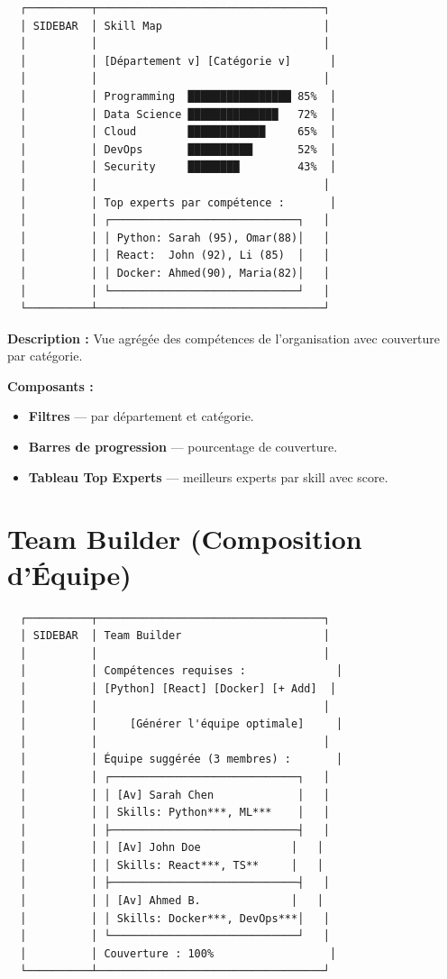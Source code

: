 \documentclass[12pt,a4paper]{article}
\begin{document}
\begin{verbatim}
  ┌──────────┬───────────────────────────────────┐
  │ SIDEBAR  │ Skill Map                         │
  │          │                                   │
  │          │ [Département v] [Catégorie v]      │
  │          │                                   │
  │          │ Programming  ████████████████ 85%  │
  │          │ Data Science ██████████████   72%  │
  │          │ Cloud        ████████████     65%  │
  │          │ DevOps       ██████████       52%  │
  │          │ Security     ████████         43%  │
  │          │                                   │
  │          │ Top experts par compétence :       │
  │          │ ┌─────────────────────────────┐   │
  │          │ │ Python: Sarah (95), Omar(88)│   │
  │          │ │ React:  John (92), Li (85)  │   │
  │          │ │ Docker: Ahmed(90), Maria(82)│   │
  │          │ └─────────────────────────────┘   │
  └──────────┴───────────────────────────────────┘
\end{verbatim}

\textbf{Description :} Vue agrégée des compétences de l'organisation avec couverture par catégorie.

\textbf{Composants :}
\begin{itemize}
    \item \textbf{Filtres} — par département et catégorie.
    \item \textbf{Barres de progression} — pourcentage de couverture.
    \item \textbf{Tableau Top Experts} — meilleurs experts par skill avec score.
\end{itemize}

\section{Team Builder (Composition d'Équipe)}

\begin{verbatim}
  ┌──────────┬───────────────────────────────────┐
  │ SIDEBAR  │ Team Builder                      │
  │          │                                   │
  │          │ Compétences requises :              │
  │          │ [Python] [React] [Docker] [+ Add]  │
  │          │                                   │
  │          │     [Générer l'équipe optimale]     │
  │          │                                   │
  │          │ Équipe suggérée (3 membres) :       │
  │          │ ┌─────────────────────────────┐   │
  │          │ │ [Av] Sarah Chen             │   │
  │          │ │ Skills: Python***, ML***    │   │
  │          │ ├─────────────────────────────┤   │
  │          │ │ [Av] John Doe              │   │
  │          │ │ Skills: React***, TS**     │   │
  │          │ ├─────────────────────────────┤   │
  │          │ │ [Av] Ahmed B.              │   │
  │          │ │ Skills: Docker***, DevOps***│   │
  │          │ └─────────────────────────────┘   │
  │          │ Couverture : 100%                  │
  └──────────┴───────────────────────────────────┘
\end{verbatim}
\end{document}
